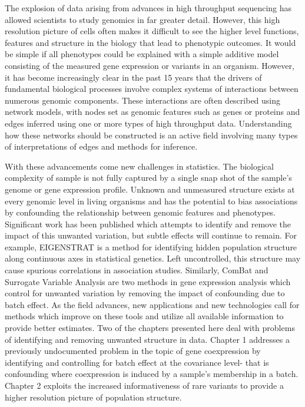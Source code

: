 
The explosion of data arising from advances in high throughput sequencing has allowed scientists to study genomics in far greater detail.  However, this high resolution picture of cells often makes it difficult to see the higher level functions, features and structure in the biology that lead to phenotypic outcomes.  It would be simple if all phenotypes could be explained with a simple additive model consisting of the measured gene expression or variants in an organism.  However, it has become increasingly clear in the past 15 years that the drivers of fundamental biological processes involve complex systems of interactions between numerous genomic components.  These interactions are often described using network models, with nodes set as genomic features such as genes or proteins and edges inferred using one or more types of high throughput data.  Understanding how these networks should be constructed is an active field involving many types of interpretations of edges and methods for inference.  

With these advancements come new challenges in statistics.  The biological complexity of sample is not fully captured by a single snap shot of the sample's genome or gene expression profile.  Unknown and unmeasured structure exists at every genomic level in living organisms and has the potential to bias associations by confounding the relationship between genomic features and phenotypes.  Significant work has been published which attempts to identify and remove the impact of this unwanted variation, but subtle effects will continue to remain.  For example, EIGENSTRAT is a method for identifying hidden population structure along continuous axes in statistical genetics.  Left uncontrolled, this structure may cause spurious correlations in association studies.  Similarly, ComBat and Surrogate Variable Analysis are two methods in gene expression analysis which control for unwanted variation by removing the impact of confounding due to batch effect.  As the field advances, new applications and new technologies call for methods which improve on these tools and utilize all available information to provide better estimates.  Two of the chapters presented here deal with problems of identifying and removing unwanted structure in data.  Chapter 1 addresses a previously undocumented problem in the topic of gene coexpression by identifying and controlling for batch effect at the covariance level- that is confounding where coexpression is induced by a sample's membership in a batch.  Chapter 2 exploits the increased informativeness of rare variants to provide a higher resolution picture of population structure.  

